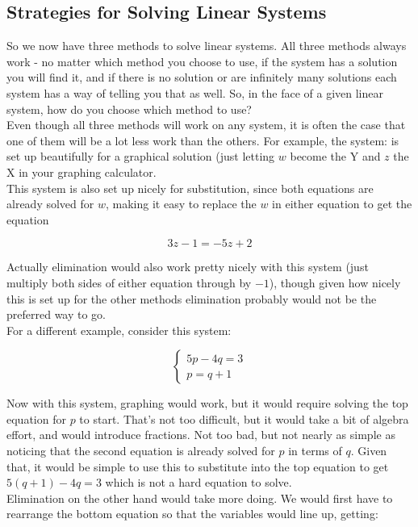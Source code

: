 \subsection{Strategies for Solving Linear Systems}

So we now have three methods to solve linear systems. All three methods always work - no matter which method you choose to use, if the system has a solution you will find it, and if there is no
solution or are infinitely many solutions each system has a way of telling you that as well. So, in the face of a given linear system, how do you choose which method to use?\\

Even though all three methods will work on any system, it is often the case that one of them will be a lot less work than the others. For example, the system: is set up beautifully for a graphical solution (just letting $w$ become the Y and $z$ the X in your graphing calculator.\\

This system is also set up nicely for substitution, since both equations are already solved for $w$, making it easy to replace the $w$ in either equation to get the equation

$$3z-1=-5z+2$$

Actually elimination would also work pretty nicely with this system (just multiply both sides of either equation through by $-1$), though given how nicely this is set up for the other methods elimination
probably would not be the preferred way to go.\\

For a different example, consider this system:

$$\begin{cases}5p-4q=3\\p=q+1 \end{cases}$$

Now with this system, graphing would work, but it would require solving the top equation for $p$ to start. That’s not too difficult, but it would take a bit of algebra effort, and would introduce fractions.  Not too bad, but not nearly as simple as noticing that the second equation is already solved for $p$ in terms of $q$. Given that, it would be simple to use this to substitute into the top equation to get $5(q+1)-4q=3$ which is not a hard equation to solve. \\

Elimination on the other hand would take more doing. We would first have to rearrange the bottom equation so that the variables would line up, getting:

